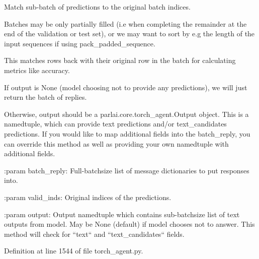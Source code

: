 \begin{DoxyVerb}Match sub-batch of predictions to the original batch indices.

Batches may be only partially filled (i.e when completing the remainder
at the end of the validation or test set), or we may want to sort by
e.g the length of the input sequences if using pack_padded_sequence.

This matches rows back with their original row in the batch for
calculating metrics like accuracy.

If output is None (model choosing not to provide any predictions), we
will just return the batch of replies.

Otherwise, output should be a parlai.core.torch_agent.Output object.
This is a namedtuple, which can provide text predictions and/or
text_candidates predictions. If you would like to map additional
fields into the batch_reply, you can override this method as well as
providing your own namedtuple with additional fields.

:param batch_reply:
    Full-batchsize list of message dictionaries to put responses into.

:param valid_inds:
    Original indices of the predictions.

:param output:
    Output namedtuple which contains sub-batchsize list of text outputs
    from model. May be None (default) if model chooses not to answer.
    This method will check for ``text`` and ``text_candidates`` fields.
\end{DoxyVerb}
 

Definition at line 1544 of file torch\+\_\+agent.\+py.



